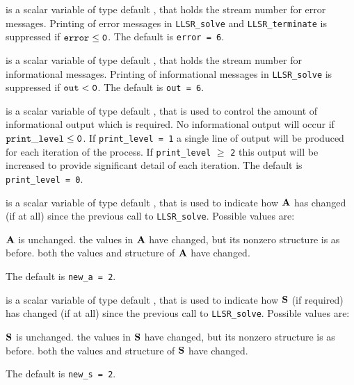 \documentclass{galahad}
\newcommand{\packagename}{LLSR}
\begin{document}
\begin{description}
 is a scalar variable of type default \integer, that holds the
stream number for error messages.
Printing of error messages in
{\tt \packagename\_solve} and {\tt \packagename\_terminate}
is suppressed if ${\tt error} \leq {\tt 0}$.
The default is {\tt error = 6}.

 is a scalar variable of type default \integer, that holds the
stream number for informational messages.
Printing of informational messages in
{\tt \packagename\_solve} is suppressed if ${\tt out} < {\tt 0}$.
The default is {\tt out = 6}.

 is a scalar variable of type default \integer,
that is used
to control the amount of informational output which is required. No
informational output will occur if ${\tt print\_level} \leq {\tt 0}$. If
{\tt print\_level = 1} a single line of output will be produced for each
iteration of the process. If {\tt print\_level} $\geq$ {\tt 2} this output
will be increased to provide significant detail of each iteration.
The default is {\tt print\_level = 0}.


 is a scalar variable of type default \integer, that is used
to indicate how ${\mathbf{A}}$ has changed (if at all) since the previous
call to {\tt \packagename\_solve}. Possible values are:
\begin{description}
 ${\mathbf{A}}$ is unchanged.
 the values in ${\mathbf{A}}$ have changed, but its nonzero structure
is as before.
 both the values and structure of ${\mathbf{A}}$ have changed.
\end{description}
The default is {\tt new\_a = 2}.

 is a scalar variable of type default \integer, that is used
to indicate how ${\mathbf{S}}$ (if required) has changed (if at all) since the previous
call to {\tt \packagename\_solve}. Possible values are:
\begin{description}
 ${\mathbf{S}}$ is unchanged.
 the values in ${\mathbf{S}}$ have changed, but its nonzero structure
is as before.
 both the values and structure of ${\mathbf{S}}$ have changed.
\end{description}
The default is {\tt new\_s = 2}.


\end{description}
\end{document}
